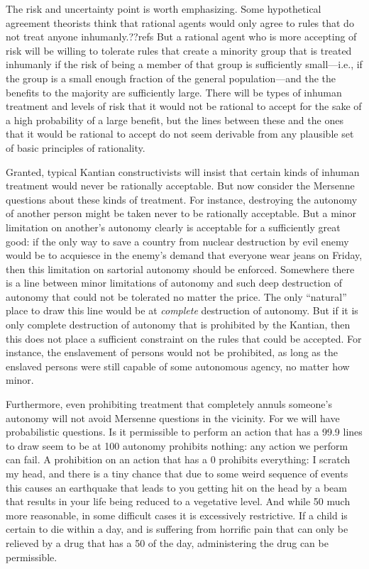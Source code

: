The risk and uncertainty point is worth emphasizing. Some hypothetical agreement theorists think that 
rational agents would only agree to rules that do not treat anyone inhumanly.??refs But a rational agent who is more accepting of
risk will be willing to tolerate rules that create a minority group that is treated inhumanly if the risk of being a member of 
that group is sufficiently small---i.e., if the group is a small enough fraction of the general population---and the the benefits 
to the majority are sufficiently large. There will be types of inhuman treatment and levels of risk that it would not be 
rational to accept for the sake of a high probability of a large benefit, but the lines between these and the ones that it would 
be rational to accept do not seem derivable from any plausible set of basic principles of rationality. 

Granted, typical Kantian constructivists will insist that certain kinds of inhuman treatment would never be rationally acceptable. But 
now consider the Mersenne questions about these kinds of treatment. For instance, destroying the autonomy of another person might
be taken never to be rationally acceptable. But a minor limitation on another's autonomy clearly is acceptable for a sufficiently
great good: if the only way to save a country from nuclear destruction by evil enemy would be to acquiesce in the enemy's demand 
that everyone wear jeans on Friday, then this limitation on sartorial autonomy should be enforced. Somewhere there is a line between
minor limitations of autonomy and such deep destruction of autonomy that could not be tolerated no matter the price. The only
``natural'' place to draw this line would be at \textit{complete} destruction of autonomy. But if it is only complete destruction
of autonomy that is prohibited by the Kantian, then this does not place a sufficient constraint on the rules that could
be accepted. For instance, the enslavement of persons would not be prohibited, as long as the enslaved persons were still capable of 
some autonomous agency, no matter how minor. 

Furthermore, even prohibiting treatment that completely annuls someone's autonomy will
not avoid Mersenne questions in the vicinity. For we will have probabilistic questions. Is it permissible to perform an action that
has a 99.9%
lines to draw seem to be at 100%
autonomy prohibits nothing: any action we perform can fail. A prohibition on an action that has a 0%
prohibits everything: I scratch my head, and there is a tiny chance that due to some weird sequence of events this causes an earthquake
that leads to you getting hit on the head by a beam that results in your life being reduced to a vegetative level. And while 50%
much more reasonable, in some difficult cases it is excessively restrictive. If a child is certain to die within a day, and is suffering
from horrific pain that can only be relieved by a drug that has a 50%
of the day, administering the drug can be permissible.

